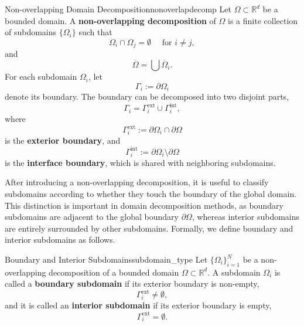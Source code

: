 \documentclass[a4paper, 11pt]{article}
\theoremstyle{remark}
\begin{document}
\begin{definition}{Non-overlapping Domain Decomposition}{nonoverlapdecomp}
Let $\Omega \subset \mathbb{R}^d$ be a bounded domain. A \textbf{non-overlapping decomposition} of $\Omega$ is a finite collection of subdomains $\{\Omega_{i}\}$ such that
\begin{equation*}
    \Omega_{i} \cap \Omega_{j} = \emptyset \quad\text{ for } i \neq j,
\end{equation*}
and
\begin{equation*}
    \overline{\Omega} = \bigcup\overline{\Omega}_{i}.
\end{equation*}
For each subdomain $\Omega_i$, let
\begin{equation*}
    \Gamma_{i} := \partial \Omega_i
\end{equation*}
denote its boundary. The boundary can be decomposed into two disjoint parts, 
\begin{equation*}
    \Gamma_{i} = \Gamma_{i}^{\text{ext}} \cup \Gamma_{i}^{\text{int}},
\end{equation*}
where
\begin{equation*}
    \Gamma_{i}^{\text{ext}} := \partial \Omega_i \cap \partial \Omega
\end{equation*}
is the \textbf{exterior boundary}, and
\begin{equation*}
    \Gamma_{i}^{\text{int}} := \partial \Omega_{i} \setminus \partial\Omega
\end{equation*}
is the \textbf{interface boundary}, which is shared with neighboring subdomains.
\end{definition}
\noindent After introducing a non-overlapping decomposition, it is useful to classify subdomains according to whether they touch the boundary of the global domain. This distinction is important in domain decomposition methods, as boundary subdomains are adjacent to the global boundary $\partial \Omega$, whereas interior subdomains are entirely surrounded by other subdomains. Formally, we define boundary and interior subdomains as follows.
\begin{definition}{Boundary and Interior Subdomains}{subdomain_type}
Let $\{\Omega_i\}_{i=1}^N$ be a non-overlapping decomposition of a bounded domain $\Omega \subset \mathbb{R}^d$. A subdomain $\Omega_i$ is called a \textbf{boundary subdomain} if its exterior boundary is non-empty,
\begin{equation*}
    \Gamma_i^{\text{ext}} \neq \emptyset,
\end{equation*}
and it is called an \textbf{interior subdomain} if its exterior boundary is empty,
\begin{equation*}
    \Gamma_i^{\text{ext}} = \emptyset.
\end{equation*}
\end{definition}
\end{document}

